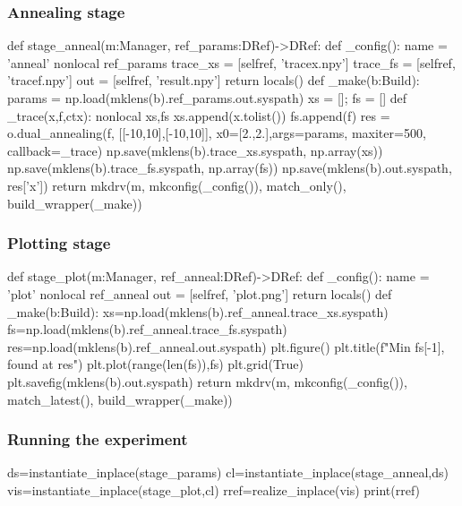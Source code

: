 \subsubsection{Annealing stage}

\begin{pythontexcode}
def stage_anneal(m:Manager, ref_params:DRef)->DRef:
  def _config():
    name = 'anneal'
    nonlocal ref_params
    trace_xs = [selfref, 'tracex.npy']
    trace_fs = [selfref, 'tracef.npy']
    out = [selfref, 'result.npy']
    return locals()
  def _make(b:Build):
    params = np.load(mklens(b).ref_params.out.syspath)
    xs = []; fs = []
    def _trace(x,f,ctx):
      nonlocal xs,fs
      xs.append(x.tolist())
      fs.append(f)
    res = o.dual_annealing(f, [[-10,10],[-10,10]],
                         x0=[2.,2.],args=params,
                         maxiter=500, callback=_trace)
    np.save(mklens(b).trace_xs.syspath, np.array(xs))
    np.save(mklens(b).trace_fs.syspath, np.array(fs))
    np.save(mklens(b).out.syspath, res['x'])
  return mkdrv(m, mkconfig(_config()), match_only(), build_wrapper(_make))
\end{pythontexcode}

\subsubsection{Plotting stage}

\begin{pythontexcode}
def stage_plot(m:Manager, ref_anneal:DRef)->DRef:
  def _config():
    name = 'plot'
    nonlocal ref_anneal
    out = [selfref, 'plot.png']
    return locals()
  def _make(b:Build):
    xs=np.load(mklens(b).ref_anneal.trace_xs.syspath)
    fs=np.load(mklens(b).ref_anneal.trace_fs.syspath)
    res=np.load(mklens(b).ref_anneal.out.syspath)
    plt.figure()
    plt.title(f"Min {fs[-1]}, found at {res}")
    plt.plot(range(len(fs)),fs)
    plt.grid(True)
    plt.savefig(mklens(b).out.syspath)
  return mkdrv(m, mkconfig(_config()), match_latest(), build_wrapper(_make))
\end{pythontexcode}

\subsubsection{Running the experiment}

\begin{pythontexcode}
ds=instantiate_inplace(stage_params)
cl=instantiate_inplace(stage_anneal,ds)
vis=instantiate_inplace(stage_plot,cl)
rref=realize_inplace(vis)
print(rref)
\end{pythontexcode}


